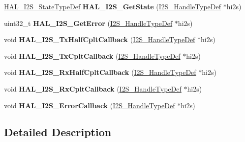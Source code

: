 \begin{DoxyCompactItemize}
\item 
\hyperlink{group___i2_s___exported___types_ga2588a0c71baf7cd6d2c1b9b11120bef0}{H\+A\+L\+\_\+\+I2\+S\+\_\+\+State\+Type\+Def} {\bfseries H\+A\+L\+\_\+\+I2\+S\+\_\+\+Get\+State} (\hyperlink{struct_i2_s___handle_type_def}{I2\+S\+\_\+\+Handle\+Type\+Def} $\ast$hi2s)\hypertarget{group___i2_s___exported___functions___group2_ga575e5ecf94a8a288b8a07e034dcb18c8}{}\label{group___i2_s___exported___functions___group2_ga575e5ecf94a8a288b8a07e034dcb18c8}

\item 
uint32\+\_\+t {\bfseries H\+A\+L\+\_\+\+I2\+S\+\_\+\+Get\+Error} (\hyperlink{struct_i2_s___handle_type_def}{I2\+S\+\_\+\+Handle\+Type\+Def} $\ast$hi2s)\hypertarget{group___i2_s___exported___functions___group2_ga222caea98be140449fc5c4a0f21efbd0}{}\label{group___i2_s___exported___functions___group2_ga222caea98be140449fc5c4a0f21efbd0}

\item 
void {\bfseries H\+A\+L\+\_\+\+I2\+S\+\_\+\+Tx\+Half\+Cplt\+Callback} (\hyperlink{struct_i2_s___handle_type_def}{I2\+S\+\_\+\+Handle\+Type\+Def} $\ast$hi2s)\hypertarget{group___i2_s___exported___functions___group2_ga5bef3c73683b81e822368c9029e495bc}{}\label{group___i2_s___exported___functions___group2_ga5bef3c73683b81e822368c9029e495bc}

\item 
void {\bfseries H\+A\+L\+\_\+\+I2\+S\+\_\+\+Tx\+Cplt\+Callback} (\hyperlink{struct_i2_s___handle_type_def}{I2\+S\+\_\+\+Handle\+Type\+Def} $\ast$hi2s)\hypertarget{group___i2_s___exported___functions___group2_ga1ef4021384eddbd41ca60454a2483bf3}{}\label{group___i2_s___exported___functions___group2_ga1ef4021384eddbd41ca60454a2483bf3}

\item 
void {\bfseries H\+A\+L\+\_\+\+I2\+S\+\_\+\+Rx\+Half\+Cplt\+Callback} (\hyperlink{struct_i2_s___handle_type_def}{I2\+S\+\_\+\+Handle\+Type\+Def} $\ast$hi2s)\hypertarget{group___i2_s___exported___functions___group2_ga6c4cd3b18c42c6de0c3f4fe7068a5b12}{}\label{group___i2_s___exported___functions___group2_ga6c4cd3b18c42c6de0c3f4fe7068a5b12}

\item 
void {\bfseries H\+A\+L\+\_\+\+I2\+S\+\_\+\+Rx\+Cplt\+Callback} (\hyperlink{struct_i2_s___handle_type_def}{I2\+S\+\_\+\+Handle\+Type\+Def} $\ast$hi2s)\hypertarget{group___i2_s___exported___functions___group2_ga18c33b2d429b06674ec30e5b2b81862c}{}\label{group___i2_s___exported___functions___group2_ga18c33b2d429b06674ec30e5b2b81862c}

\item 
void {\bfseries H\+A\+L\+\_\+\+I2\+S\+\_\+\+Error\+Callback} (\hyperlink{struct_i2_s___handle_type_def}{I2\+S\+\_\+\+Handle\+Type\+Def} $\ast$hi2s)\hypertarget{group___i2_s___exported___functions___group2_ga8ca0ebeda8edc26d4201fe8657be294e}{}\label{group___i2_s___exported___functions___group2_ga8ca0ebeda8edc26d4201fe8657be294e}

\end{DoxyCompactItemize}


\subsection{Detailed Description}
